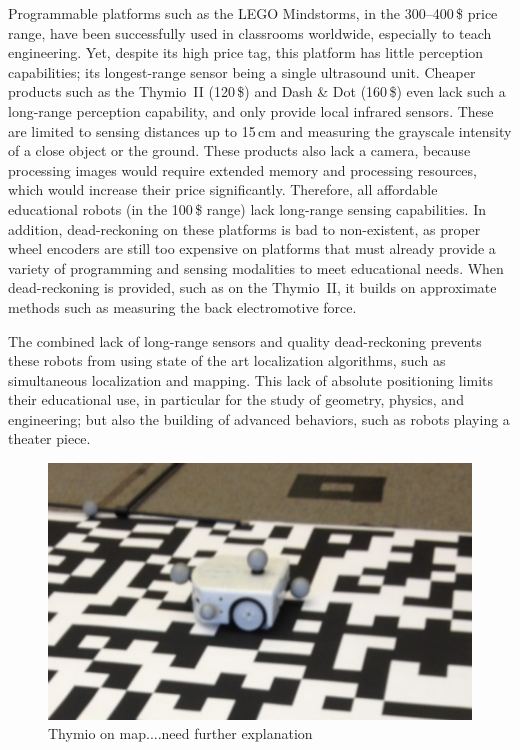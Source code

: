 \documentclass[letterpaper, 10pt, conference]{ieeeconf}
\begin{document}
Programmable platforms such as the LEGO Mindstorms, in the 300--400\,\$ price range, have been successfully used in classrooms worldwide, especially to teach engineering.
Yet, despite its high price tag, this platform has little perception capabilities; its longest-range sensor being a single ultrasound unit.
Cheaper products such as the Thymio~II (120\,\$) and Dash \& Dot (160\,\$) even lack such a long-range perception capability, and only provide local infrared sensors.
These are limited to sensing distances up to 15\,cm and measuring the grayscale intensity of a close object or the ground.
These products also lack a camera, because processing images would require extended memory and processing resources, which would increase their price significantly.
Therefore, all affordable educational robots (in the 100\,\$ range) lack long-range sensing capabilities.
In addition, dead-reckoning on these platforms is bad to non-existent, as proper wheel encoders are still too expensive on platforms that must already provide a variety of programming and sensing modalities to meet educational needs.
When dead-reckoning is provided, such as on the Thymio~II, it builds on approximate methods such as measuring the back electromotive force.

The combined lack of long-range sensors and quality dead-reckoning prevents these robots from using state of the art localization algorithms, such as simultaneous localization and mapping.
This lack of absolute positioning limits their educational use, in particular for the study of geometry, physics, and engineering; but also the building of advanced behaviors, such as robots playing a theater piece.
\begin{figure}
\includegraphics[width=.80\columnwidth]{thymio_on_map}
\caption{Thymio on map....need further explanation}
\label{fig:thymio_on_map}
\end{figure}
\end{document}
